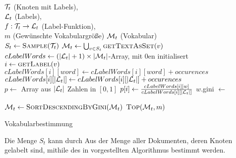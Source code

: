 \begin{algorithm}[H]
    \begin{algorithmic}[1]
        \Require \\
                 $\mathcal{T}_t$ (Knoten mit Labels),\\
                 $\mathcal{L}_t$ (Labels),\\
                 $f:\mathcal{T}_t \rightarrow \mathcal{L}_t$ (Label-Funktion),\\
                 $m$ (Gewünschte Vokabulargröße)
        \Ensure  $\mathcal{M}_t$ (Vokabular)\\

        \State $S_t \gets \Call{Sample}{\T_t}$ 
        \State $\M_t \gets \bigcup_{v \in S_t} \Call{getTextAsSet}{v}$ 
        \State $cLabelWords \gets (|\mathcal{L}_t|+1) \times |\mathcal{M}_t|$-Array, mit 0en initialisert\\

         
            \State $i \gets \Call{getLabel}{v}$
                \State $cLabelWords[i][word] \gets cLabelWords[i][word] + occurences$
                \State $cLabelWords[i][|\mathcal{L}_t|] \gets cLabelWords[i][|\mathcal{L}_t|] + occurences$
            \EndFor
        \EndFor
        \\
            \State $p \gets $ Array aus $|\mathcal{L}_t|$ Zahlen in $[0, 1]$
                \State $p[i] \gets \frac{cLabelWords[i][w]}{cLabelWords[i][|\mathcal{L}_t|]}$
            \EndFor
            \State $w$.gini $\gets$ 
        \EndFor

        \State $\M_t \gets \Call{SortDescendingByGini}{\M_t}$
        \State \Return $\Call{Top}{\M_t, m}$
    \end{algorithmic}
\caption{Vokabularbestimmung}
\label{alg:vokabularbestimmung}
\end{algorithm}

Die Menge $S_t$ kann durch Aus der Menge aller Dokumenten, deren 
Knoten gelabelt sind, mithile des in \cite{Vitter} vorgestellten
Algorithmus bestimmt werden.
